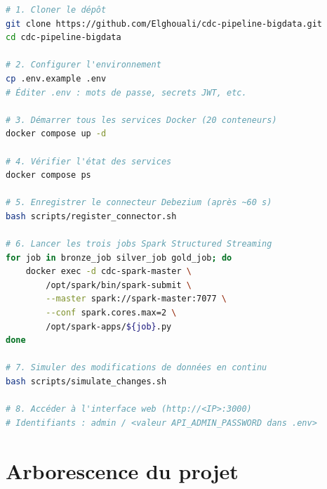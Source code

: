 \documentclass[12pt,a4paper]{report}
\begin{document}
\begin{lstlisting}[language=bash,
    caption={Démarrage complet du pipeline CDC Medallion}]
# 1. Cloner le dépôt
git clone https://github.com/Elghouali/cdc-pipeline-bigdata.git
cd cdc-pipeline-bigdata

# 2. Configurer l'environnement
cp .env.example .env
# Éditer .env : mots de passe, secrets JWT, etc.

# 3. Démarrer tous les services Docker (20 conteneurs)
docker compose up -d

# 4. Vérifier l'état des services
docker compose ps

# 5. Enregistrer le connecteur Debezium (après ~60 s)
bash scripts/register_connector.sh

# 6. Lancer les trois jobs Spark Structured Streaming
for job in bronze_job silver_job gold_job; do
    docker exec -d cdc-spark-master \
        /opt/spark/bin/spark-submit \
        --master spark://spark-master:7077 \
        --conf spark.cores.max=2 \
        /opt/spark-apps/${job}.py
done

# 7. Simuler des modifications de données en continu
bash scripts/simulate_changes.sh

# 8. Accéder à l'interface web (http://<IP>:3000)
# Identifiants : admin / <valeur API_ADMIN_PASSWORD dans .env>
\end{lstlisting}

\chapter{Arborescence du projet}
\end{document}
